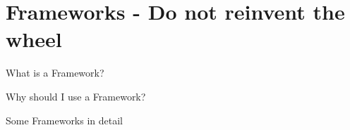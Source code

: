 \section{Frameworks - Do not reinvent the wheel}
\begin{frame}{What is a Framework?}
\end{frame}

\begin{frame}{Why should I use a Framework?}
\end{frame}

\begin{frame}{Some Frameworks in detail}
\end{frame}